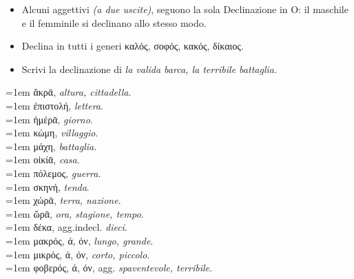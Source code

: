 \documentclass[nols]{tufte-handout}
\newcommand{\didobf}[1]{{\GFSDidotBf #1}}
\newcommand{\textls}[2][5]{%
    \begingroup\addfontfeatures{LetterSpace=#1}#2\endgroup
  }
\renewcommand{\smallcapsspacing}[1]{\textls[10]{#1}}
\renewcommand{\textsc}[1]{\smallcapsspacing{\textsmallcaps{#1}}}
\begin{document}
\begin{itemize}
\item[\textsc{1.}] Alcuni aggettivi \textit{(a due uscite)}, seguono la sola Declinazione in O: il maschile e il femminile si declinano allo stesso modo. 
\end{itemize}

\begin{itemize}
\item[\textsc{1.}] Declina in tutti i generi \didobf{καλός, σοφός, κακός, δίκαιος}.
\item[\textsc{2.}] Scrivi la declinazione di \textit{la valida barca, la terribile battaglia.}
\end{itemize}

\newpage


\begin{multicols}{2}
    \noindent \hangindent=1em \didobf{ἄκρᾱ,} \textit{altura, cittadella}.  \\
    \noindent \hangindent=1em \didobf{ἐπιστολή,} \textit{lettera}.  \\
    \noindent \hangindent=1em \didobf{ἡμέρᾱ,} \textit{giorno}.  \\
    \noindent \hangindent=1em \didobf{κώμη,} \textit{villaggio}.  \\
    \noindent \hangindent=1em \didobf{μάχη,} \textit{battaglia}.  \\
    \noindent \hangindent=1em \didobf{οἰκίᾱ,} \textit{casa}.  \\
    \noindent \hangindent=1em \didobf{πόλεμος,} \textit{guerra}.  \\
    \noindent \hangindent=1em \didobf{σκηνή,} \textit{tenda}.  \\
	
    \noindent \hangindent=1em \didobf{χώρᾱ,} \textit{terra, nazione}.  \\
    \noindent \hangindent=1em \didobf{ὥρᾱ,} \textit{ora, stagione, tempo}.  \\
	
	\noindent \hangindent=1em \didobf{δέκα,} agg.indecl. \textit{dieci}. \\ 
	
	
    \noindent \hangindent=1em \didobf{μακρός, ά, όν,} \textit{lungo, grande}.  \\
	\noindent \hangindent=1em \didobf{μικρός, ά, όν,} \textit{corto, piccolo}.  \\
	\noindent \hangindent=1em \didobf{φοβερός, ά, όν,} agg. \textit{spaventevole, terribile}.  \\
\end{multicols}
\end{document}
